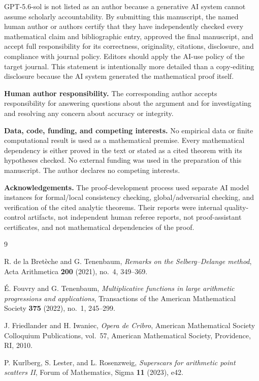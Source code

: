 \documentclass[10pt]{amsart}
\numberwithin{equation}{section}
\theoremstyle{remark}
\begin{document}
GPT-5.6-sol is not listed as an author because a generative AI system cannot
assume scholarly accountability. By submitting this manuscript, the named
human author or authors certify that they have independently checked every
mathematical claim and bibliographic entry, approved the final manuscript,
and accept full responsibility for its correctness, originality, citations,
disclosure, and compliance with journal policy. Editors should apply the
AI-use policy of the target journal. This statement is intentionally more
detailed than a copy-editing disclosure because the AI system generated the
mathematical proof itself.

\medskip
\noindent\textbf{Human author responsibility.}
The corresponding author accepts responsibility for answering questions
about the argument and for investigating and resolving any concern about
accuracy or integrity.

\medskip
\noindent\textbf{Data, code, funding, and competing interests.}
No empirical data or finite computational result is used as a mathematical
premise. Every mathematical dependency is either proved in the text or
stated as a cited theorem with its hypotheses checked. No external funding
was used in the preparation of this manuscript. The author declares no
competing interests.

\medskip
\noindent\textbf{Acknowledgements.}
The proof-development process used separate AI model instances for
formal/local consistency checking, global/adversarial checking, and
verification of the cited analytic theorems. Their reports were internal
quality-control artifacts, not independent human referee reports, not
proof-assistant certificates, and not mathematical dependencies of the
proof.

\begin{thebibliography}{9}

R. de la Bret\`eche and G. Tenenbaum,
\emph{Remarks on the Selberg--Delange method},
Acta Arithmetica \textbf{200} (2021), no.~4, 349--369.

\'E. Fouvry and G. Tenenbaum,
\emph{Multiplicative functions in large arithmetic progressions and
applications},
Transactions of the American Mathematical Society \textbf{375} (2022),
no.~1, 245--299.

J. Friedlander and H. Iwaniec,
\emph{Opera de Cribro},
American Mathematical Society Colloquium Publications, vol.~57,
American Mathematical Society, Providence, RI, 2010.

P. Kurlberg, S. Lester, and L. Rosenzweig,
\emph{Superscars for arithmetic point scatters II},
Forum of Mathematics, Sigma \textbf{11} (2023), e42.

\end{thebibliography}
\end{document}
